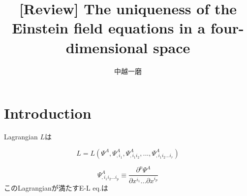 \documentclass[12pt, a4paper]{jsarticle}
\title{[Review] The uniqueness of the Einstein field equations in a four-dimensional space}
\author{中越一磨}
\begin{document}
\maketitle

\section{Introduction}
Lagrangian \(L\)は

\begin{equation}
  L=L(\Psi ^A, \Psi ^A _{,i_1}, \Psi ^A _{,i_1 i_2}, ... , \Psi ^A _{,i_1 i_2 ... i_r})
\end{equation} 

\begin{equation}
  \Psi ^A _{,i_1 i_2 ... i_p} \equiv  \frac{\partial ^p \Psi^A}{\partial x^{i_1} ...\partial x^{i_p}}
\end{equation}
このLagrangianが満たすE-L eq.は


\section{}

\begin{thebibliography}{9}
\end{thebibliography}
\end{document}
